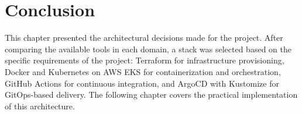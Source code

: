 \setcounter{secnumdepth}{0} %
\section{Conclusion}
This chapter presented the architectural decisions made for the project. 
After comparing the available tools in each domain, a stack was selected 
based on the specific requirements of the project: Terraform for infrastructure 
provisioning, Docker and Kubernetes on AWS EKS for containerization and 
orchestration, GitHub Actions for continuous integration, and ArgoCD with 
Kustomize for GitOps-based delivery. The following chapter covers the practical 
implementation of this architecture.

